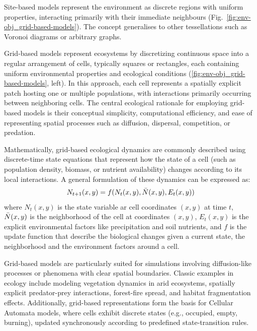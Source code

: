 Site-based models represent the environment as discrete regions with uniform properties, interacting primarily with their immediate neighbours (Fig.~\ref{fig:env-obj_grid-based-models}). The concept generalises to other tessellations such as Voronoi diagrams or arbitrary graphs.

Grid-based models represent ecosystems by discretizing continuous space into a regular arrangement of cells, typically squares or rectangles, each containing uniform environmental properties and ecological conditions (\cref{fig:env-obj_grid-based-models}, left). In this approach, each cell represents a spatially explicit patch hosting one or multiple populations, with interactions primarily occurring between neighboring cells. The central ecological rationale for employing grid-based models is their conceptual simplicity, computational efficiency, and ease of representing spatial processes such as diffusion, dispersal, competition, or predation.

Mathematically, grid-based ecological dynamics are commonly described using discrete-time state equations that represent how the state of a cell (such as population density, biomass, or nutrient availability) changes according to its local interactions. A general formulation of these dynamics can be expressed as:
\begin{align}
    N_{t+1}(x,y) = f(N_t(x,y), \Bar{N}(x, y), E_t(x, y))
\end{align}
where $N_t(x, y)$ is the state variable ar cell coordinates $(x, y)$ at time $t$, $\Bar{N}(x, y)$ is the neighborhood of the cell at coordinates $(x, y)$, $E_t(x, y)$ is the explicit environmental factors like precipitation and soil nutrients, and $f$ is the update function that describe the biological changes given a current state, the neighborhood and the environment factors around a cell.

Grid-based models are particularly suited for simulations involving diffusion-like processes or phenomena with clear spatial boundaries. Classic examples in ecology include modeling vegetation dynamics in arid ecosystems, spatially explicit predator-prey interactions, forest-fire spread, and habitat fragmentation effects. Additionally, grid-based representations form the basis for Cellular Automata models, where cells exhibit discrete states (e.g., occupied, empty, burning), updated synchronously according to predefined state-transition rules.

